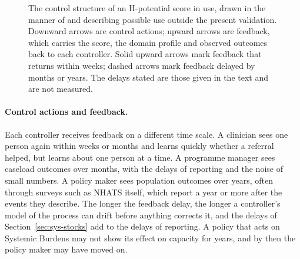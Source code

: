 \begin{figure}[htbp]
{}
\caption[The control structure of a score in use]{The control structure of an
H-potential score in use, drawn in the manner of \citet{leveson_2011} and
describing possible use outside the present validation. Downward arrows are
control actions; upward arrows are feedback, which carries the score, the
domain profile and observed outcomes back to each controller. Solid upward
arrows mark feedback that returns within weeks; dashed arrows mark feedback
delayed by months or years. The delays stated are those given in the text and
are not measured.}
\label{fig:sys-control}
\end{figure}

\paragraph{Control actions and feedback.} Each controller receives feedback
on a different time scale. A clinician sees one person again within weeks or
months and learns quickly whether a referral helped, but learns about one
person at a time. A programme manager sees caseload outcomes over months, with
the delays of reporting and the noise of small numbers. A policy maker sees
population outcomes over years, often through surveys such as NHATS itself,
which report a year or more after the events they describe. The longer the
feedback delay, the longer a controller's model of the process can drift
before anything corrects it, and the delays of Section~\ref{sec:sys-stocks}
add to the delays of reporting. A policy that acts on Systemic Burdens may not
show its effect on capacity for years, and by then the policy maker may have
moved on.

